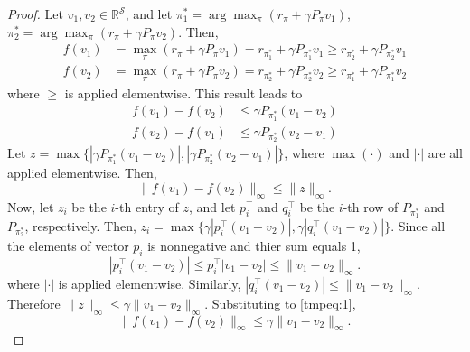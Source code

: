         \begin{proof}
            Let $v_1, v_2 \in \mathbb{R}^{\mathcal{S}}$, and let $\pi_1^* = \arg\max_\pi{(r_\pi + \gamma P_\pi v_1)}$, $\pi_2^* = \arg\max_\pi{(r_\pi + \gamma P_\pi v_2)}$.
            Then,
            \begin{align}
                f(v_1) &= \max_\pi{(r_\pi + \gamma P_\pi v_1)} = r_{\pi_1^*} + \gamma P_{\pi_1^*}v_1 \geq r_{\pi_2^*} + \gamma P_{\pi_2^*}v_1 \\
                f(v_2) &= \max_\pi{(r_\pi + \gamma P_\pi v_2)} = r_{\pi_2^*} + \gamma P_{\pi_2^*}v_2 \geq r_{\pi_1^*} + \gamma P_{\pi_1^*}v_2
            \end{align}
            where $\geq$ is applied elementwise. This result leads to
            \begin{align}
                f(v_1)-f(v_2) &\leq \gamma P_{\pi_1^*}(v_1-v_2) \\
                f(v_2)-f(v_1) &\leq \gamma P_{\pi_2^*}(v_2-v_1)
            \end{align}
            Let $z=\max{\{|\gamma P_{\pi_1^*}(v_1-v_2)|, |\gamma P_{\pi_2^*}(v_2-v_1)|\}}$, where $\max(\cdot)$ and $|\cdot|$ are all applied elementwise.
            Then,
            \begin{equation}
                \|f(v_1) - f(v_2)\|_{\infty} \leq \|z\|_{\infty}. \label{tmpeq:1}
            \end{equation}
            Now, let $z_i$ be the $i$-th entry of $z$, and let $p_i^{\top}$ and $q_i^{\top}$ be the $i$-th row of $P_{\pi_1^*}$ and $P_{\pi_2^*}$, respectively.
            Then, $z_i = \max{\{\gamma |p_i^{\top}(v_1-v_2)|, \gamma|q_i^{\top}(v_1-v_2)|\}}$.
            Since all the elements of vector $p_i$ is nonnegative and thier sum equals 1,
            \begin{equation}
                |p_i^\top(v_1-v_2)| \leq p_i^\top|v_1-v_2| \leq \|v_1-v_2\|_\infty.
            \end{equation}
            where $|\cdot|$ is applied elementwise.
            Similarly, $|q_i^\top(v_1-v_2)| \leq \|v_1-v_2\|_\infty$. Therefore $\|z\|_\infty \leq \gamma \|v_1-v_2\|_\infty$.
            Substituting to \ref{tmpeq:1},
            \begin{equation}
                \|f(v_1)-f(v_2)\|_{\infty} \leq \gamma \|v_1 - v_2\|_\infty.
            \end{equation}
        \end{proof}
\newpage
